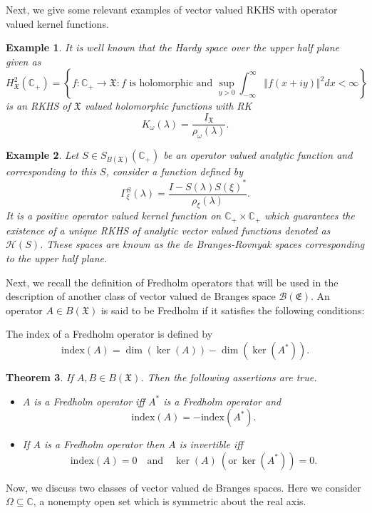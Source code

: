 \documentclass [12pt,reqno]{amsart}
\numberwithin{equation}{subsection}
\newtheorem{thm}{Theorem}[section]
\newtheorem{example}[thm]{Example}
\numberwithin{equation}{section}
\begin{document}
Next, we give some relevant examples of vector valued RKHS with operator valued kernel functions.
\begin{example}
It is well known that the Hardy space over the upper half plane given as 
\[ H^2_{\mathfrak{X}}(\mathbb{C}_+) = \left\{ f: \mathbb{C}_+ \rightarrow \mathfrak{X} : f \text{ is holomorphic and } \sup_{y>0} \int_{-\infty}^{\infty} \Vert f(x+iy) \Vert^2 dx < \infty \right\} \]
is an RKHS of \( \mathfrak{X} \) valued holomorphic functions with RK
\[ K_{\omega}(\lambda) = \frac{I_{\mathfrak{X}}}{\rho_{\omega}(\lambda)}. \]
\end{example}
\begin{example}
Let \( S \in S_{B(\mathfrak{X})}(\mathbb{C}_+) \) be an operator valued analytic function and corresponding to this \( S \), consider a function defined by 
\[ \Gamma_{\xi}^{S}(\lambda) = \frac{I-S(\lambda)S(\xi)^*}{\rho_{\xi}(\lambda)}. \]
It is a positive operator valued kernel function on \( \mathbb{C}_+ \times \mathbb{C}_+ \) which guarantees the existence of a unique RKHS of analytic vector valued functions denoted as \( \mathcal{H}(S) \). These spaces are known as the de Branges-Rovnyak spaces corresponding to the upper half plane.
\end{example}
Next, we recall the definition of Fredholm operators that will be used in the description of another class of vector valued de Branges space \(\mathcal{B}(\mathfrak{E})\). An operator \( A \in  B(\mathfrak{X}) \) is said to be Fredholm if it satisfies the following conditions:
The index of a Fredholm operator is defined by  
\begin{equation}
\text{index}(A) = \dim(\ker(A)) - \dim(\ker(A^*)).
\end{equation}

\begin{thm} \label{Theorem 2.5}
If \( A,B \in B(\mathfrak{X}) \). Then the following assertions are true.
\begin{itemize}
\item[(1)] \( A \) is a Fredholm operator iff \( A^* \) is a Fredholm operator and \[ \text{index}(A) = - \text{index}(A^*). \]
\item[(2)] If \( A \) is a Fredholm operator then \( A \) is invertible iff \[ \text{index}(A) = 0 \quad \text{and} \quad \ker(A) \ (\text{or} \ \ker(A^*)) = 0. \]
\end{itemize}
\end{thm}
Now, we discuss two classes of vector valued de Branges spaces. Here we consider \(\Omega \subseteq \mathbb{C}\), a nonempty open set which is symmetric about the real axis.
\end{document}
